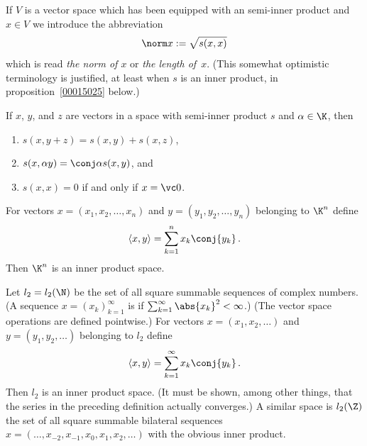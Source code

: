\begin{notn}\label{norm_notn} If $V$ is a vector space which has been equipped with an
semi-inner product and $x \in V$ we introduce the abbreviation
  \[ \norm x := \sqrt{s(x,x)} \]
which is read \emph{the norm of $x$} or \emph{the length of~$x$}.  (This somewhat
optimistic terminology is justified, at least when $s$ is an inner product, in proposition~\ref{00015025} below.)
\end{notn}

\begin{prop}\label{00015001} If $x$, $y$, and $z$ are vectors in a space with semi-inner product $s$ and $\alpha \in \K$, then
 \begin{enumerate}[label=\rm{(\alph*)}]
   \item $s(x,y + z)  = s(x,y) + s(x,z)$,
   \item $s(x,\alpha y) = \conj\alpha s(x,y)$, and
   \item $s(x,x) = 0$ if and only if $x = \vc 0$.
 \end{enumerate}
\end{prop}

\begin{exam}\label{000150012} For vectors $x = (x_1,x_2,\dots,x_n)$ and $y = (y_1,y_2,\dots,y_n)$
belonging to $\K^n$ define
   \[ \langle x,y \rangle = \sum_{k=1}^n x_k \conj{y_k}\,. \]
Then
$\K^n$ is an inner product space.
\end{exam}

\begin{exam}\label{000150013} Let $l_2 = l_2(\N)$ be the set of all square summable sequences of
complex numbers. (A sequence $x = (x_k)_{k=1}^\infty$ is
 if $\sum_{k=1}^\infty \abs{x_k}^2 < \infty$.) (The vector space operations are defined
pointwise.) For vectors $x = (x_1,x_2,\dots)$ and $y = (y_1,y_2,\dots)$ belonging to $l_2$ define
   \[ \langle x,y \rangle = \sum_{k=1}^\infty x_k \conj{y_k}\,. \]
Then $l_2$ is an inner product space.  (It must be shown, among other things, that the
series in the preceding definition actually converges.)  A similar space is $l_2(\Z)$ the set of all square summable
bilateral sequences $x = (\dots,x_{-2},x_{-1},x_0,x_1,x_2,\dots)$ with the obvious inner product.
\end{exam}

